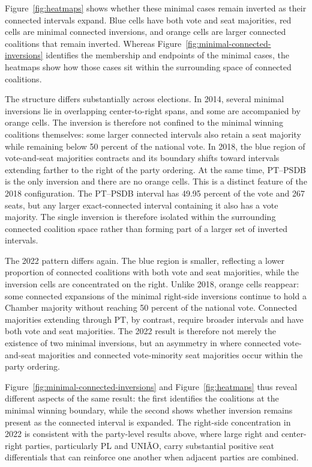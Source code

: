 \documentclass[11pt]{article}
\begin{document}
Figure~\ref{fig:heatmaps} shows whether these minimal cases remain inverted as
their connected intervals expand. Blue cells have both vote and seat majorities,
red cells are minimal connected inversions, and orange cells are larger
connected coalitions that remain inverted. Whereas Figure~\ref{fig:minimal-connected-inversions} identifies the
membership and endpoints of the minimal cases, the heatmaps show how those cases
sit within the surrounding space of connected coalitions.

The structure differs substantially across elections. In 2014, several
minimal inversions lie in overlapping center-to-right spans, and some are
accompanied by orange cells. The inversion is therefore not confined to the
minimal winning coalitions themselves: some larger connected intervals
also retain a seat majority while remaining below 50 percent of the national
vote. In 2018, the blue region of vote-and-seat majorities contracts and its
boundary shifts toward intervals extending farther to the right of the party
ordering. At the same time, PT--PSDB is the only inversion and there are
no orange cells. This is a distinct feature of the 2018 configuration. The
PT--PSDB interval has 49.95 percent of the vote and 267 seats, but any
larger exact-connected interval containing it also has a vote majority. The
single inversion is therefore isolated within the surrounding connected
coalition space rather than forming part of a larger set of inverted intervals.

The 2022 pattern differs again. The blue region is smaller, reflecting a lower
proportion of connected coalitions with both vote and seat majorities, while the
inversion cells are concentrated on the right. Unlike 2018, orange cells
reappear: some connected expansions of the minimal right-side inversions
continue to hold a Chamber majority without reaching 50 percent of the national
vote. Connected majorities extending through PT, by contrast, require broader
intervals and have both vote and seat majorities. The 2022 result is therefore
not merely the existence of two minimal inversions, but an asymmetry in where
connected vote-and-seat majorities and connected vote-minority seat majorities
occur within the party ordering.

Figure~\ref{fig:minimal-connected-inversions} and
Figure~\ref{fig:heatmaps} thus reveal different aspects of the same result:
the first identifies the coalitions at the minimal winning boundary, while
the second shows whether inversion remains present as the connected
interval is expanded. The right-side concentration in 2022 is consistent
with the party-level results above, where large right and center-right parties,
particularly PL and UNIÃO, carry substantial positive seat differentials
that can reinforce one another when adjacent parties are combined.
\end{document}
